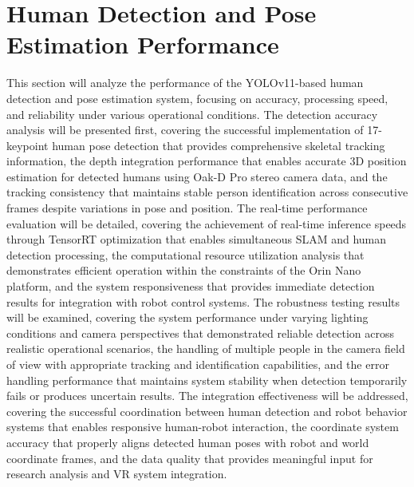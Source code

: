 \section{Human Detection and Pose Estimation Performance}
This section will analyze the performance of the YOLOv11-based human detection and pose estimation system, focusing on accuracy, processing speed, and reliability under various operational conditions. The detection accuracy analysis will be presented first, covering the successful implementation of 17-keypoint human pose detection that provides comprehensive skeletal tracking information, the depth integration performance that enables accurate 3D position estimation for detected humans using Oak-D Pro stereo camera data, and the tracking consistency that maintains stable person identification across consecutive frames despite variations in pose and position. The real-time performance evaluation will be detailed, covering the achievement of real-time inference speeds through TensorRT optimization that enables simultaneous SLAM and human detection processing, the computational resource utilization analysis that demonstrates efficient operation within the constraints of the Orin Nano platform, and the system responsiveness that provides immediate detection results for integration with robot control systems. The robustness testing results will be examined, covering the system performance under varying lighting conditions and camera perspectives that demonstrated reliable detection across realistic operational scenarios, the handling of multiple people in the camera field of view with appropriate tracking and identification capabilities, and the error handling performance that maintains system stability when detection temporarily fails or produces uncertain results. The integration effectiveness will be addressed, covering the successful coordination between human detection and robot behavior systems that enables responsive human-robot interaction, the coordinate system accuracy that properly aligns detected human poses with robot and world coordinate frames, and the data quality that provides meaningful input for research analysis and VR system integration.

